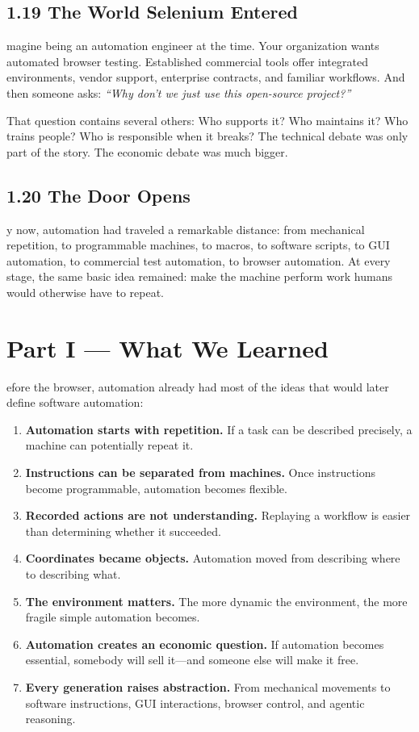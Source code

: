 \documentclass[11pt, a4paper, openany]{book}
\newcommand{\initialcap}[1]{{\fontfamily{lmss}\selectfont\huge\textbf{#1}}}
\begin{document}
\section{1.19 The World Selenium Entered}
\noindent \initialcap{I}magine being an automation engineer at the time. Your organization wants automated browser testing. Established commercial tools offer integrated environments, vendor support, enterprise contracts, and familiar workflows. And then someone asks: \textit{``Why don't we just use this open-source project?''}

That question contains several others: Who supports it? Who maintains it? Who trains people? Who is responsible when it breaks? The technical debate was only part of the story. The economic debate was much bigger.

\section{1.20 The Door Opens}
\noindent \initialcap{B}y now, automation had traveled a remarkable distance: from mechanical repetition, to programmable machines, to macros, to software scripts, to GUI automation, to commercial test automation, to browser automation. At every stage, the same basic idea remained: make the machine perform work humans would otherwise have to repeat.

\chapter*{Part I --- What We Learned}

\noindent \initialcap{B}efore the browser, automation already had most of the ideas that would later define software automation:
\begin{enumerate}
    \item \textbf{Automation starts with repetition.} If a task can be described precisely, a machine can potentially repeat it.
    \item \textbf{Instructions can be separated from machines.} Once instructions become programmable, automation becomes flexible.
    \item \textbf{Recorded actions are not understanding.} Replaying a workflow is easier than determining whether it succeeded.
    \item \textbf{Coordinates became objects.} Automation moved from describing where to describing what.
    \item \textbf{The environment matters.} The more dynamic the environment, the more fragile simple automation becomes.
    \item \textbf{Automation creates an economic question.} If automation becomes essential, somebody will sell it---and someone else will make it free.
    \item \textbf{Every generation raises abstraction.} From mechanical movements to software instructions, GUI interactions, browser control, and agentic reasoning.
\end{enumerate}
\end{document}
